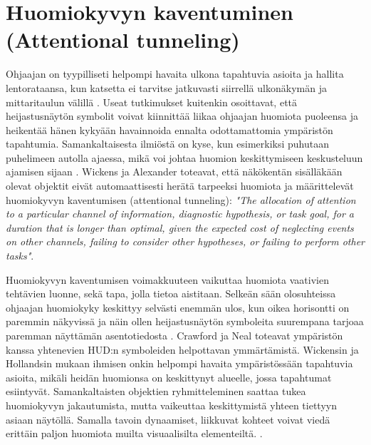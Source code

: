 \documentclass[utf8,bachelor,manualbib]{gradu3}
\begin{document}
\section{Huomiokyvyn kaventuminen (Attentional tunneling)}

Ohjaajan on tyypilliseti helpompi havaita ulkona tapahtuvia asioita ja hallita lentorataansa, kun katsetta ei tarvitse jatkuvasti siirrellä ulkonäkymän ja mittaritaulun välillä \citep{crawfordneal2006, ververswickens1998}. Useat tutkimukset \citep{fischerym1980, kimkaber2014, weintraubensing1992, wickenslong1995, wickensalexander2009} kuitenkin osoittavat, että heijastusnäytön symbolit voivat kiinnittää liikaa ohjaajan huomiota puoleensa ja heikentää hänen kykyään havainnoida ennalta odottamattomia ympäristön tapahtumia. Samankaltaisesta ilmiöstä on kyse, kun esimerkiksi puhutaan puhelimeen autolla ajaessa, mikä voi johtaa huomion keskittymiseen keskusteluun ajamisen sijaan \citep{horreywickens2006, strayerdrews2007, strayerym2001}. Wickens ja Alexander \citeyearpar{wickensalexander2009} toteavat, että näkökentän sisälläkään olevat objektit eivät automaattisesti herätä tarpeeksi huomiota ja määrittelevät huomiokyvyn kaventumisen (attentional tunneling): \emph{"The allocation of attention to a particular channel of information, diagnostic hypothesis, or task goal, for a duration that is longer than optimal, given the expected cost of neglecting events on other channels, failing to consider other hypotheses, or failing to perform other tasks"}.

Huomiokyvyn kaventumisen voimakkuuteen vaikuttaa huomiota vaativien tehtävien luonne, sekä tapa, jolla tietoa aistitaan. Selkeän sään olosuhteissa ohjaajan huomiokyky keskittyy selvästi enemmän ulos, kun oikea horisontti on paremmin näkyvissä ja näin ollen heijastusnäytön symboleita suurempana tarjoaa paremman näyttämän asentotiedosta \citep{ververswickens1998}. Crawford ja Neal \citeyearpar{crawfordneal2006} toteavat ympäristön kanssa yhtenevien HUD:n symboleiden helpottavan ymmärtämistä. Wickensin ja Hollandsin mukaan \citeyearpar{wickenshollands2000} ihmisen onkin helpompi havaita ympäristössään tapahtuvia asioita, mikäli heidän huomionsa on keskittynyt alueelle, jossa tapahtumat esiintyvät. Samankaltaisten objektien ryhmitteleminen saattaa tukea huomiokyvyn jakautumista, mutta vaikeuttaa keskittymistä yhteen tiettyyn asiaan näytöllä. Samalla tavoin dynaamiset, liikkuvat kohteet voivat viedä erittäin paljon huomiota muilta visuaalisilta elementeiltä. \citep{crawfordneal2006}.
\end{document}
